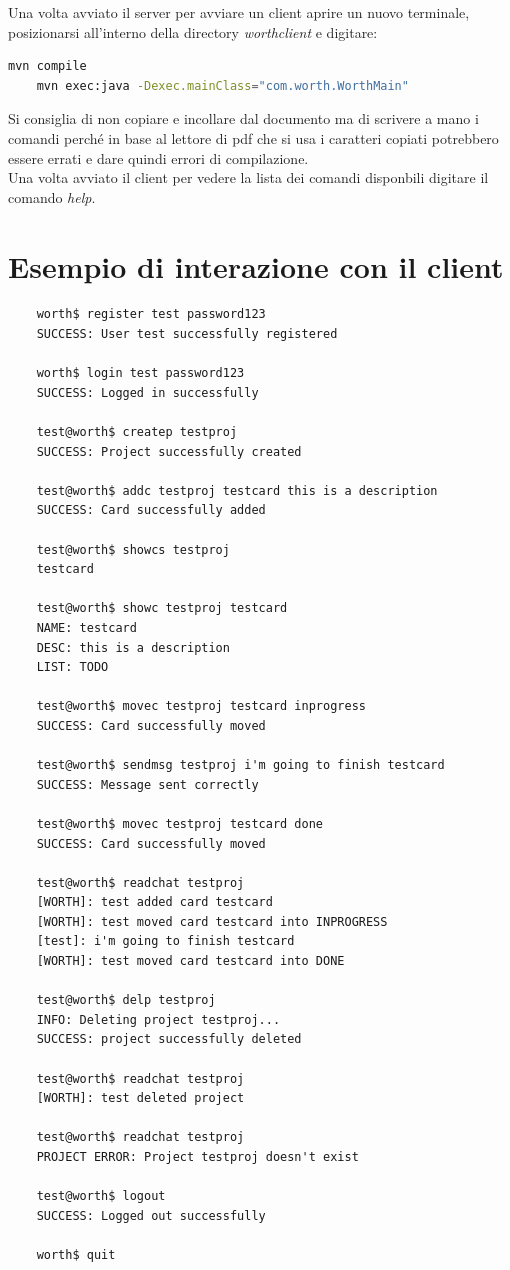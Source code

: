 \documentclass[11pt]{report}
\begin{document}
	Una volta avviato il server per avviare un client aprire un nuovo terminale, posizionarsi all'interno della directory \textit{worthclient} e digitare:
	\begin{lstlisting}[language=bash]
	mvn compile
	mvn exec:java -Dexec.mainClass="com.worth.WorthMain"
	\end{lstlisting}
	
	Si consiglia di non copiare e incollare dal documento ma di scrivere a mano i comandi perché in base al lettore di pdf che si usa i caratteri copiati potrebbero essere errati e dare quindi errori di compilazione.\\
	Una volta avviato il client per vedere la lista dei comandi disponbili digitare il comando \textit{help}.
	
	\section{Esempio di interazione con il client}
	\begin{lstlisting}
	worth$ register test password123
	SUCCESS: User test successfully registered
	
	worth$ login test password123
	SUCCESS: Logged in successfully
	
	test@worth$ createp testproj
	SUCCESS: Project successfully created
	
	test@worth$ addc testproj testcard this is a description
	SUCCESS: Card successfully added
	
	test@worth$ showcs testproj
	testcard
	
	test@worth$ showc testproj testcard
	NAME: testcard
	DESC: this is a description
	LIST: TODO
	
	test@worth$ movec testproj testcard inprogress
	SUCCESS: Card successfully moved
	
	test@worth$ sendmsg testproj i'm going to finish testcard
	SUCCESS: Message sent correctly
	
	test@worth$ movec testproj testcard done
	SUCCESS: Card successfully moved
	
	test@worth$ readchat testproj
	[WORTH]: test added card testcard
	[WORTH]: test moved card testcard into INPROGRESS
	[test]: i'm going to finish testcard
	[WORTH]: test moved card testcard into DONE
	
	test@worth$ delp testproj
	INFO: Deleting project testproj...
	SUCCESS: project successfully deleted
	
	test@worth$ readchat testproj
	[WORTH]: test deleted project
	
	test@worth$ readchat testproj
	PROJECT ERROR: Project testproj doesn't exist
	
	test@worth$ logout
	SUCCESS: Logged out successfully
	
	worth$ quit
	\end{lstlisting}
	
	
	
	

	
	
	
	
	 
	
	
	 
	
	
	
	
	
	
\end{document}
